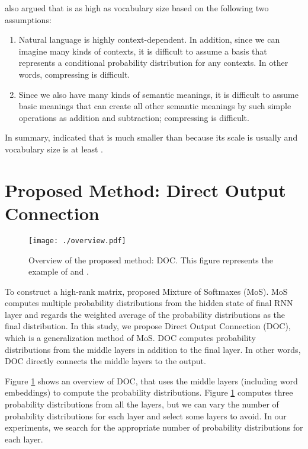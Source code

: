\documentclass[11pt,a4paper]{article}
\begin{document}
 also argued that  is as high as vocabulary size  based on the following two assumptions:
\begin{enumerate}
  \item Natural language is highly context-dependent. In addition, since we can imagine many kinds of contexts, it is difficult to assume a basis that represents a conditional probability distribution for any contexts. In other words, compressing  is difficult.
  \item Since we also have many kinds of semantic meanings, it is difficult to assume basic meanings that can create all other semantic meanings by such simple operations as addition and subtraction; compressing  is difficult.
\end{enumerate}
In summary,  indicated that  is much smaller than  because its scale is usually  and vocabulary size  is at least .



\section{Proposed Method: Direct Output Connection}
\begin{figure}[!t]
  \centering
  \texttt{[image: ./overview.pdf]}
   \caption{Overview of the proposed method: DOC. This figure represents the example of  and .}
   \label{fig:overview}
\end{figure}

To construct a high-rank matrix,  proposed Mixture of Softmaxes (MoS).
MoS computes multiple probability distributions from the hidden state of final RNN layer  and regards the weighted average of the probability distributions as the final distribution.
In this study, we propose Direct Output Connection (DOC), which is a generalization method of MoS.
DOC computes probability distributions from the middle layers in addition to the final layer.
In other words, DOC directly connects the middle layers to the output.


Figure \ref{fig:overview} shows an overview of DOC, that uses the middle layers (including word embeddings) to compute the probability distributions.
Figure \ref{fig:overview} computes three probability distributions from all the layers, but we can vary the number of probability distributions for each layer and select some layers to avoid.
In our experiments, we search for the appropriate number of probability distributions for each layer.
\end{document}
